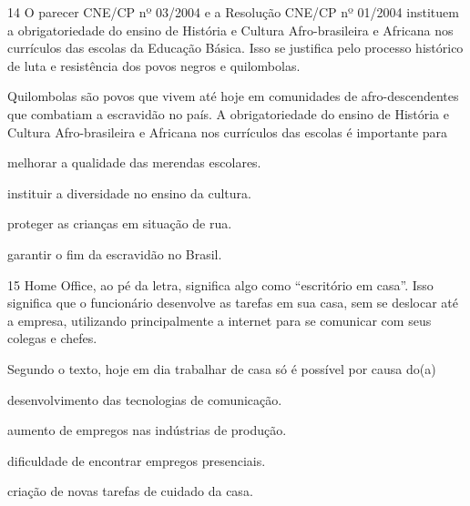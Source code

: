 \pagebreak
\num{14} O parecer CNE/CP nº 03/2004 e a Resolução CNE/CP nº 01/2004 instituem a
obrigatoriedade do ensino de História e Cultura Afro-brasileira e
Africana nos currículos das escolas da Educação
Básica. Isso se justifica pelo processo histórico de luta e
resistência dos povos negros e quilombolas.


\noindent{}Quilombolas são povos que vivem até hoje em comunidades de
afro-descendentes que combatiam a escravidão no país. A
obrigatoriedade do ensino de História e Cultura Afro-brasileira e
Africana nos currículos das escolas é importante para

\begin{escolha}
\item melhorar a qualidade das merendas escolares.

\item instituir a diversidade no ensino da cultura.

\item proteger as crianças em situação de rua.

\item garantir o fim da escravidão no Brasil.
\end{escolha}


\num{15} Home Office, ao pé da letra, significa algo como “escritório em casa”. Isso significa que o
funcionário desenvolve as tarefas em sua casa, sem se
deslocar até a empresa,
utilizando principalmente a internet para se comunicar com seus colegas e chefes.


\noindent{}Segundo o texto, hoje em dia trabalhar de casa só é possível por causa do(a)

\begin{escolha}
\item desenvolvimento das tecnologias de comunicação.

\item aumento de empregos nas indústrias de produção.

\item dificuldade de encontrar empregos presenciais.

\item criação de novas tarefas de cuidado da casa.
\end{escolha}

